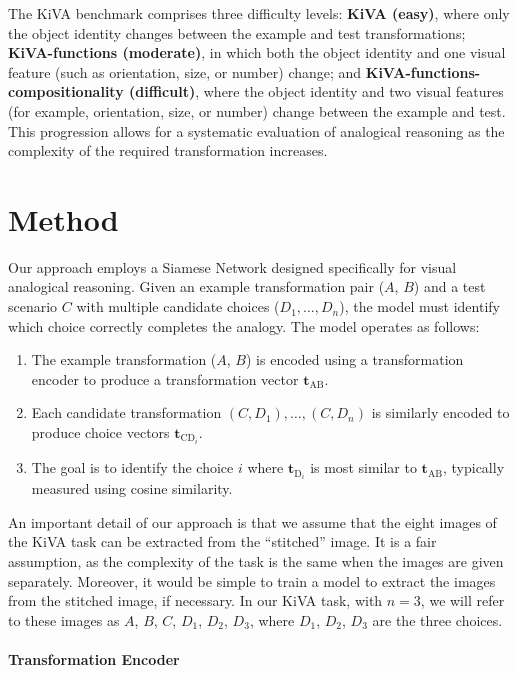 \documentclass[twocolumn]{article} %
\begin{document}
The KiVA benchmark comprises three difficulty levels: \textbf{KiVA (easy)}, where only the object identity changes between the example and test transformations; \textbf{KiVA-functions (moderate)}, in which both the object identity and one visual feature (such as orientation, size, or number) change; and \textbf{KiVA-functions-compositionality (difficult)}, where the object identity and two visual features (for example, orientation, size, or number) change between the example and test. This progression allows for a systematic evaluation of analogical reasoning as the complexity of the required transformation increases.

\section{Method}

Our approach employs a Siamese Network \cite{Chicco2021SiameseOverview} designed specifically for visual analogical reasoning. Given an example transformation pair ($A$, $B$) and a test scenario $C$ with multiple candidate choices ($D_1, \dots, D_n$), the model must identify which choice correctly completes the analogy. The model operates as follows:
\begin{enumerate}
    \item The example transformation ($A$, $B$) is encoded using a transformation encoder to produce a transformation vector $\mathbf{t}_{\mathrm{AB}}$.
    \item Each candidate transformation $(C, D_1), \ldots, (C, D_n)$ is similarly encoded to produce choice vectors $\mathbf{t}_{\mathrm{CD}_i}$.
    \item The goal is to identify the choice $i$ where $\mathbf{t}_{\mathrm{D}_i}$ is most similar to $\mathbf{t}_{\mathrm{AB}}$, typically measured using cosine similarity.
\end{enumerate}

An important detail of our approach is that we assume that the eight images of the KiVA task can be extracted from the ``stitched'' image. It is a fair assumption, as the complexity of the task is the same when the images are given separately. Moreover, it would be simple to train a model to extract the images from the stitched image, if necessary. In our KiVA task, with $n=3$, we will refer to these images as $A$, $B$, $C$, $D_1$, $D_2$, $D_3$, where $D_1$, $D_2$, $D_3$ are the three choices. 

\paragraph{Transformation Encoder}
\end{document}
